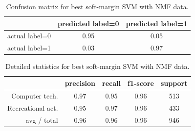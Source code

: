 \documentclass[letterpaper]{article}
\begin{document}
\begin{table}[H]
\centering
\begin{tabular}{c|cc}
 & predicted label=0 & predicted label=1 \\ \hline
actual label=0 & 0.95 & 0.05 \\
actual label=1 & 0.03 & 0.97 \\
\end{tabular}
\caption{Confusion matrix for best soft-margin SVM with NMF data.}
\end{table}

\begin{table}[H]
\centering
\begin{tabular}{r|cccc}
 & precision & recall & f1-score & support \\ \hline
Computer tech. & 0.97 & 0.95 & 0.96 & 513 \\
Recreational act. & 0.95 & 0.97 & 0.96 & 433 \\
avg / total & 0.96 & 0.96 & 0.96 & 946 \\
\end{tabular}
\caption{Detailed statistics for best soft-margin SVM with NMF data.}
\end{table}
\end{document}
